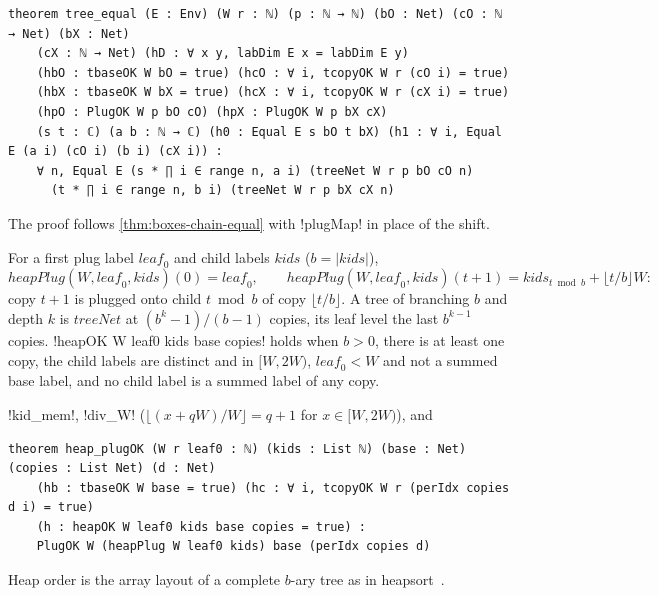 {\begin{theorem}\label{thm:boxes-tree-equal}
\begin{lstlisting}[style=leanbox]
theorem tree_equal (E : Env) (W r : ℕ) (p : ℕ → ℕ) (bO : Net) (cO : ℕ → Net) (bX : Net)
    (cX : ℕ → Net) (hD : ∀ x y, labDim E x = labDim E y)
    (hbO : tbaseOK W bO = true) (hcO : ∀ i, tcopyOK W r (cO i) = true)
    (hbX : tbaseOK W bX = true) (hcX : ∀ i, tcopyOK W r (cX i) = true)
    (hpO : PlugOK W p bO cO) (hpX : PlugOK W p bX cX)
    (s t : ℂ) (a b : ℕ → ℂ) (h0 : Equal E s bO t bX) (h1 : ∀ i, Equal E (a i) (cO i) (b i) (cX i)) :
    ∀ n, Equal E (s * ∏ i ∈ range n, a i) (treeNet W r p bO cO n)
      (t * ∏ i ∈ range n, b i) (treeNet W r p bX cX n)
\end{lstlisting}
\end{theorem}
\noindent The proof follows \cref{thm:boxes-chain-equal} with \lbx!plugMap! in place of the shift.

\begin{definition}\label{def:boxes-heapPlug}
For a first plug label $\mathit{leaf}_0$ and child labels $\mathit{kids}$ ($b=|\mathit{kids}|$),
\[
\mathit{heapPlug}(W,\mathit{leaf}_0,\mathit{kids})(0)=\mathit{leaf}_0,\qquad \mathit{heapPlug}(W,\mathit{leaf}_0,\mathit{kids})(t+1)=\mathit{kids}_{t\bmod b}+\lfloor t/b\rfloor W:
\]
copy $t+1$ is plugged onto child $t\bmod b$ of copy $\lfloor t/b\rfloor$. A tree of branching $b$ and depth $k$ is $\mathit{treeNet}$ at $(b^k-1)/(b-1)$ copies, its leaf level the last $b^{k-1}$ copies. \lbx!heapOK W leaf0 kids base copies! holds when $b>0$, there is at least one copy, the child labels are distinct and in $[W,2W)$, $\mathit{leaf}_0<W$ and not a summed base label, and no child label is a summed label of any copy.
\end{definition}
\lbx!kid_mem!, \lbx!div_W! ($\lfloor(x+qW)/W\rfloor=q+1$ for $x\in[W,2W)$), and
\begin{lstlisting}[style=leanbox]
theorem heap_plugOK (W r leaf0 : ℕ) (kids : List ℕ) (base : Net) (copies : List Net) (d : Net)
    (hb : tbaseOK W base = true) (hc : ∀ i, tcopyOK W r (perIdx copies d i) = true)
    (h : heapOK W leaf0 kids base copies = true) :
    PlugOK W (heapPlug W leaf0 kids) base (perIdx copies d)
\end{lstlisting}
Heap order is the array layout of a complete $b$-ary tree as in heapsort~\cite{williams1964heapsort}.

}
